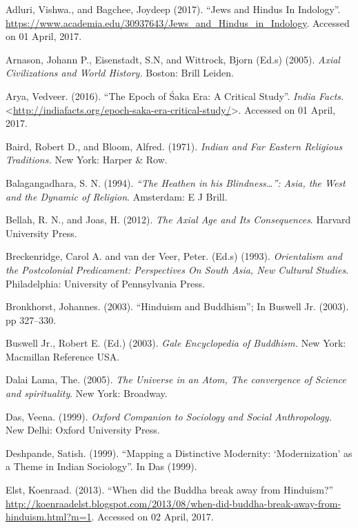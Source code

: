 \begin{thebibliography}{99}
\itemsep=1pt
 Adluri, Vishwa., and Bagchee, Joydeep (2017). “Jews and Hindus In Indology”. \url{https://www.academia.edu/30937643/Jews_and_Hindus_in_Indology}. Accessed on 01 April, 2017.

  Arnason, Johann P., Eisenstadt, S.N, and Wittrock, Bjorn (Ed.s) (2005). \textit{Axial Civilizations and World History.} Boston: Brill Leiden.

  Arya, Vedveer. (2016). “The Epoch of Śaka Era: A Critical Study”. \textit{India Facts.} \textless \url{http://indiafacts.org/epoch-saka-era-critical-study/}\textgreater . Accessed on 01 April, 2017.

  Baird, Robert D., and Bloom, Alfred. (1971). \textit{Indian and Far Eastern Religious Traditions.} New York: Harper \& Row.

  Balagangadhara, S. N. (1994). \textit{“The Heathen in his Blindness…”: Asia, the West and the Dynamic of Religion}. Amsterdam: E J Brill.

  Bellah, R. N., and Joas, H. (2012). \textit{The Axial Age and Its Consequences}. Harvard University Press.

  Breckenridge, Carol A. and van der Veer, Peter. (Ed.s) (1993). \textit{Orientalism and the Postcolonial Predicament: Perspectives On South Asia, New Cultural Studies}. Philadelphia: University of Pennsylvania Press.

  Bronkhorst, Johannes. (2003). “Hinduism and Buddhism”; In Buswell Jr. (2003). pp 327--330.

  Buswell Jr., Robert E. (Ed.) (2003). \textit{Gale Encyclopedia of Buddhism.} New York: Macmillan Reference USA.

  Dalai Lama, The. (2005). \textit{The Universe in an Atom, The convergence of Science and spirituality}. New York: Broadway.

  Das, Veena. (1999). \textit{Oxford Companion to Sociology and Social Anthropology.} New Delhi: Oxford University Press.

  Deshpande, Satish. (1999). “Mapping a Distinctive Modernity: ‘Modernization’ as a Theme in Indian Sociology”. In Das (1999).

  Elst, Koenraad. (2013). “When did the Buddha break away from Hinduism?” \url{http://koenraadelst.blogspot.com/2013/08/when-did-buddha-break-away-from-hinduism.html?m=1}. Accessed on 02 April, 2017.


\end{thebibliography}
